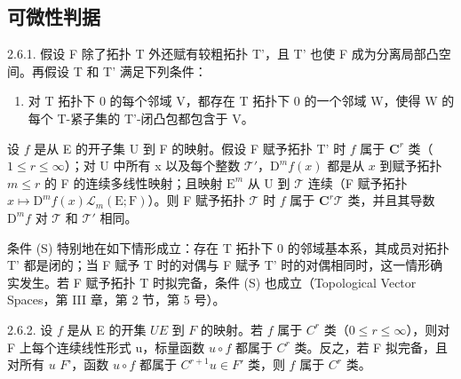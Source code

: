 \subsection{可微性判据}

2.6.1. 假设 F 除了拓扑 T 外还赋有较粗拓扑 T'，且 T' 也使 F 成为分离局部凸空间。再假设 T 和 T' 满足下列条件：

\begin{enumerate}
\def\labelenumi{(\Alph{enumi})}
\setcounter{enumi}{18}
\tightlist
\item
  对 T 拓扑下 0 的每个邻域 V，都存在 T 拓扑下 0 的一个邻域 W，使得 W 的每个 T-紧子集的 T'-闭凸包都包含于 V。
\end{enumerate}

设 \(f\) 是从 E 的开子集 U 到 F 的映射。假设 F 赋予拓扑 T' 时 \(f\) 属于 \(\mathbf{C}^{r}\) 类（\(1 \leqslant r \leqslant \infty\)）；对 U 中所有 x 以及每个整数 \(\mathcal{T}'\)，\(\mathrm{D}^{m}f(x)\) 都是从 \(x\) 到赋予拓扑 \(m \leqslant r\) 的 F 的连续多线性映射；且映射 \(\mathrm{E}^{m}\) 从 U 到 \(\mathcal{T}\) 连续（F 赋予拓扑 \(x \mapsto \mathrm{D}^{m}f(x)\)\(\mathcal{L}_{m}(\mathrm{E};\mathrm{F})\)）。则 F 赋予拓扑 \(\mathcal{T}\) 时 \(f\) 属于 \(\mathbf{C}^{r}\)\(\mathcal{T}\) 类，并且其导数 \(\mathrm{D}^{m}f\) 对 \(\mathcal{T}\) 和 \(\mathcal{T}'\) 相同。

条件 (S) 特别地在如下情形成立：存在 T 拓扑下 0 的邻域基本系，其成员对拓扑 T' 都是闭的；当 F 赋予 T 时的对偶与 F 赋予 T' 时的对偶相同时，这一情形确实发生。若 F 赋予拓扑 T 时拟完备，条件 (S) 也成立（Topological Vector Spaces，第 III 章，第 2 节，第 5 号）。

2.6.2. 设 \(f\) 是从 E 的开集 \(U\)\(E\) 到 \(F\) 的映射。若 \(f\) 属于 \(C^r\) 类（\(0 \leqslant r \leqslant \infty\)），则对 F 上每个连续线性形式 u，标量函数 \(u \circ f\) 都属于 \(C^r\) 类。反之，若 F 拟完备，且对所有 \(u\)  \(F\)'，函数 \(u \circ f\) 都属于 \(C^{r+1}\)\(u \in F'\) 类，则 \(f\) 属于 \(C^r\) 类。

